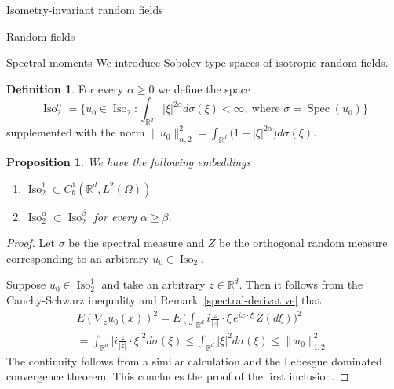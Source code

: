 \documentclass[a4paper,10pt,fleqn]{amsart}
\newtheorem{proposition}[theorem]{Proposition}
\theoremstyle{remark}
\theoremstyle{definition}
\newtheorem{definition}[theorem]{Definition}
\DeclareMathOperator{\Iso}{Iso}
\DeclareMathOperator{\Spec}{Spec}
\newcommand{\grad} {\nabla_{\!z}}
\newcommand{\X} {{\mathbb{R}^d}}
\renewcommand{\=} {\overset{d}{=}}
\newcommand{\Ld} {{L^2(\Omega)}}
\begin{document}
\begin{section}{Isometry-invariant random fields}
\begin{subsection}{Random fields}
\end{subsection}
  \begin{subsection}{Spectral moments}
   We introduce Sobolev-type spaces of isotropic random fields.
 \begin{definition}
  For every $\alpha\geq0$ we define the space
  \begin{equation*}
   \Iso^\alpha_2  = 
   \Big\{ u_0 \in \Iso_2 : \int_\X|\xi|^{2\alpha}d\sigma(\xi) < \infty,\ \text{where $\sigma=\Spec(u_0)$}\Big\}
  \end{equation*}
  supplemented with the norm $\|u_0\|_{\alpha,2}^2 = \int_\X \big(1+|\xi|^{2\alpha}\big)d\sigma(\xi)$. 
 \end{definition}
 \begin{proposition}\label{iso-c1}We have the following embeddings
 \begin{enumerate}
  \item $\Iso_2^1\subset C^1_b(\X,\Ld)$
  \item $\Iso^\alpha_2\subset\Iso^\beta_2$ for every $\alpha\geq\beta$. 
 \end{enumerate}
 \end{proposition}
 \begin{proof}
  Let $\sigma$ be the spectral measure and $Z$ be the orthogonal random measure corresponding to an arbitrary
  $u_0\in\Iso_2$.
  
  Suppose $u_0\in\Iso^1_2$ and take an arbitrary $z\in\X$.
  Then it follows from the Cauchy-Schwarz inequality and Remark~\ref{spectral-derivative} that
  \begin{multline*}
   E(\grad u_0(x))^2 = E\,\Big(\int_\X i\tfrac{z}{|z|}\cdot\xi\,e^{ix\cdot\xi}\,Z(d\xi)\Big)^2 \\
   = \int_\X \big|i\tfrac{z}{|z|}\cdot\xi\big|^2 d\sigma(\xi)
   \leq \int_\X|\xi|^{2}d\sigma(\xi) \leq\|u_0\|_{1,2}^2.
  \end{multline*} The continuity follows from a similar calculation and the Lebesgue dominated convergence theorem.
  This concludes the proof of the first inclusion.
  

\end{proof}
\end{subsection}
\end{section}
\end{document}
